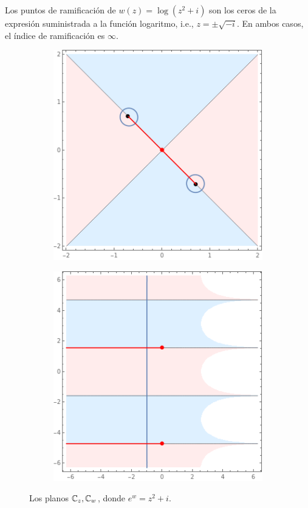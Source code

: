 \begin{solution}
\begin{itemize}
\begin{enumerate}[label=\alph*)]
        Los puntos de ramificación de $w(z) = \log(z^2 + i)$ son los ceros de la expresión suministrada a la función logaritmo, i.e., $z = \pm \sqrt {-i}$. En ambos casos, el índice de ramificación es $\infty$.
        \begin{figure}[h]
            \centering
            \begin{subfigure}{.4\textwidth}
                \centering
                \includegraphics[scale=0.4]{ramification/6-z.png}
            \end{subfigure}
            \begin{subfigure}{.4\textwidth}
                \centering
                \includegraphics[scale=0.4]{ramification/6-w.png}
            \end{subfigure}
            \caption{Los planos $\mathbb C_z, \mathbb C_w$, donde $e^w = z^2 + i$.}
        \end{figure}
        

\end{enumerate}
\end{itemize}
\end{solution}
